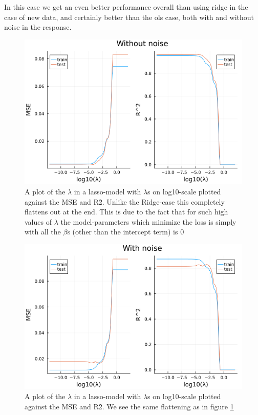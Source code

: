 \documentclass{article}
\begin{document}
In this case we get an even better performance overall than using ridge in the case of
new data, and certainly better than the ols case, both with and without noise in
the response.

\begin{figure}
    \centerline{\includegraphics[scale=0.5]{lasso_without_noise}}
    \caption{A plot of the $\lambda$ in a lasso-model with $\lambda$s on log10-scale plotted against the MSE and R\^2. Unlike the Ridge-case this completely flattens out at the end. This is due to the fact that for such high values of $\lambda$ the model-parameters which minimize the loss is simply with all the $\beta$s (other than the intercept term) is $0$}
    \label{Lasso-no-noise}
\end{figure}
\begin{figure}
    \centerline{\includegraphics[scale=0.5]{lasso_with_noise}}
    \caption{A plot of the $\lambda$ in a lasso-model with $\lambda$s on log10-scale plotted against the MSE and R\^2. We see the same flattening as in figure \ref{Lasso-no-noise}}
    \label{Lasso-with-noise}
\end{figure}
\end{document}
